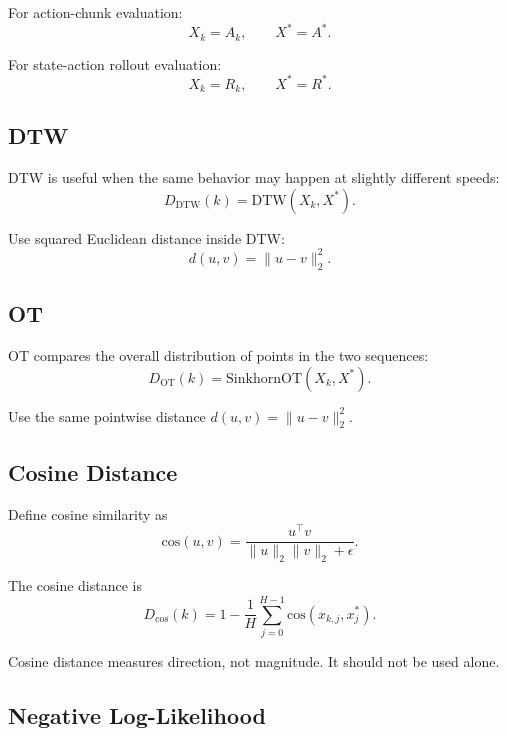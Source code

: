 \documentclass[11pt]{article}
\begin{document}
For action-chunk evaluation:
\begin{equation}
X_k=A_k,
\qquad
X^*=A^*.
\end{equation}

For state-action rollout evaluation:
\begin{equation}
X_k=R_k,
\qquad
X^*=R^*.
\end{equation}

\subsection{DTW}

DTW is useful when the same behavior may happen at slightly different speeds:
\begin{equation}
D_{\mathrm{DTW}}(k)=\mathrm{DTW}(X_k,X^*).
\end{equation}

Use squared Euclidean distance inside DTW:
\begin{equation}
d(u,v)=\|u-v\|_2^2.
\end{equation}

\subsection{OT}

OT compares the overall distribution of points in the two sequences:
\begin{equation}
D_{\mathrm{OT}}(k)=\mathrm{SinkhornOT}(X_k,X^*).
\end{equation}

Use the same pointwise distance $d(u,v)=\|u-v\|_2^2$.

\subsection{Cosine Distance}

Define cosine similarity as
\begin{equation}
\mathrm{cos}(u,v)=\frac{u^\top v}{\|u\|_2\|v\|_2+\epsilon}.
\end{equation}

The cosine distance is
\begin{equation}
D_{\mathrm{cos}}(k)=1-\frac{1}{H}\sum_{j=0}^{H-1}\mathrm{cos}(x_{k,j},x^*_j).
\end{equation}

Cosine distance measures direction, not magnitude. It should not be used alone.

\subsection{Negative Log-Likelihood}
\end{document}
